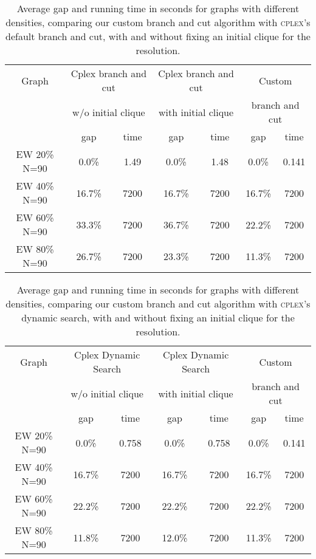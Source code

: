 \begin{table}[h]
\centering
\begin{tabular}{|c|cc|cc|cc|}
\hline
\multicolumn{1}{|c|}{Graph} & \multicolumn{2}{|c|}{Cplex branch and cut} & \multicolumn{2}{|c|}{Cplex branch and cut} & \multicolumn{2}{|c|}{Custom \PCP{}}
\\
\multicolumn{1}{|c|}{} & \multicolumn{2}{|c|}{w/o initial clique} & \multicolumn{2}{|c|}{with initial clique} & \multicolumn{2}{|c|}{branch and cut}
\\
\hline
& gap & time & gap & time & gap & time
\\
\hline
EW 20\% N=90 & 0.0\% & 1.49 & 0.0\% & 1.48 & 0.0\% & 0.141
\\
EW 40\% N=90 & 16.7\% & 7200 & 16.7\% & 7200 & 16.7\% & 7200
\\
EW 60\% N=90 & 33.3\% & 7200 & 36.7\% & 7200 & 22.2\% & 7200
\\
EW 80\% N=90 & 26.7\% & 7200 & 23.3\% & 7200 & 11.3\% & 7200
\\
\hline 
\end{tabular} 
\caption{Average gap and running time in seconds for graphs with different densities, comparing our custom \PCP{} branch and cut algorithm with \textsc{cplex}'s default branch and cut, with and without fixing an initial clique for the resolution.}
\label{table:final:cplexbnc}
\end{table}

\begin{table}[h]
\centering
\begin{tabular}{|c|cc|cc|cc|}
\hline
\multicolumn{1}{|c|}{Graph} & \multicolumn{2}{|c|}{Cplex Dynamic Search} & \multicolumn{2}{|c|}{Cplex Dynamic Search} & \multicolumn{2}{|c|}{Custom \PCP{}}
\\
\multicolumn{1}{|c|}{} & \multicolumn{2}{|c|}{w/o initial clique} & \multicolumn{2}{|c|}{with initial clique} & \multicolumn{2}{|c|}{branch and cut}
\\
\hline
& gap & time & gap & time & gap & time
\\
\hline
EW 20\% N=90 & 0.0\% & 0.758 & 0.0\% & 0.758 & 0.0\% & 0.141
\\
EW 40\% N=90 & 16.7\% & 7200 & 16.7\% & 7200 & 16.7\% & 7200
\\
EW 60\% N=90 & 22.2\% & 7200 & 22.2\% & 7200 & 22.2\% & 7200
\\
EW 80\% N=90 & 11.8\% & 7200 & 12.0\% & 7200 & 11.3\% & 7200
\\
\hline 
\end{tabular} 
\caption{Average gap and running time in seconds for graphs with different densities, comparing our custom \PCP{} branch and cut algorithm with \textsc{cplex}'s dynamic search, with and without fixing an initial clique for the resolution.}
\label{table:final:cplexdynamicsearch}
\end{table}

